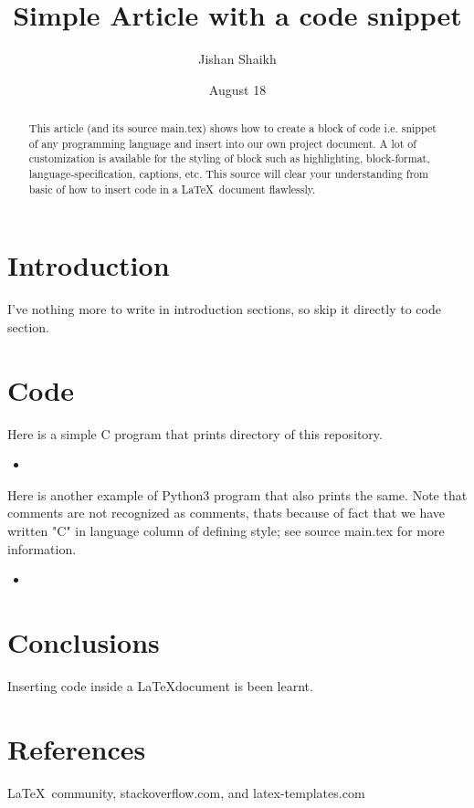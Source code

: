 \documentclass[12pt]{article}
\title{Simple Article with a code snippet}
\author{Jishan Shaikh}
\date{August 18}
\newcommand{\insertcode}[2]{
	\begin{itemize}
		\item[]
		
	\end{itemize}}
\begin{document}
	\maketitle
	\begin{abstract}
		This article (and its source main.tex) shows how to create a block of code i.e. snippet of any programming language and insert into our own project document. A lot of customization is available for the styling of block such as highlighting, block-format, language-specification, captions, etc. This source will clear your understanding from basic of how to insert code in a \LaTeX \  document flawlessly.
	\end{abstract}
	\section{Introduction}
		I've nothing more to write in introduction sections, so skip it directly to code section.
	
	\section{Code}
		Here is a simple C program that prints directory of this repository.
		\insertcode{"Scripts/example.c"}{C program template-1.} 
	
		Here is another example of Python3 program that also prints the same. Note that comments are not recognized as comments, thats because of fact that we have written "C" in language column of defining style; see source main.tex for more information.
		\insertcode{"Scripts/example.py"}{Python program template-1}
	
	\section{Conclusions}
		Inserting code inside a \LaTeX document is been learnt.
	
	\section{References}
		\LaTeX \ community, stackoverflow.com, and latex-templates.com
\end{document}
